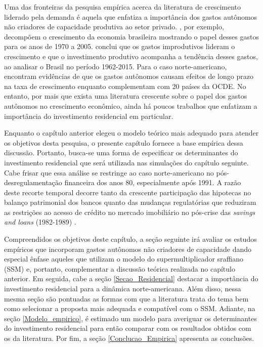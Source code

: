 Uma das fronteiras da pesquisa empírica acerca da literatura de crescimento liderado pela demanda é aquela que enfatiza a importância dos gastos autônomos não criadores de capacidade produtiva ao setor privado. \textcite{freitas_pattern_2013}, por exemplo, decompõem o crescimento da economia brasileira mostrando o papel desses gastos para os anos de  1970 a 2005. \textcite{braga_investment_2018} conclui que os gastos improdutivos lideram o crescimento e que o investimento produtivo acompanha a tendência desses gastos, ao analisar o Brasil no período 1962-2015. Para o caso norte-americano, \textcite{girardi_long-run_2016} encontram evidências de que os gastos autônomos causam efeitos de longo prazo na taxa de crescimento enquanto \textcite{girardi_autonomous_2018} complementam com 20 países da OCDE. No entanto, por mais que exista uma literatura crescente sobre o papel dos gastos autônomos no crescimento econômico, ainda há poucos trabalhos que enfatizam a importância do investimento residencial em particular. 

Enquanto o capítulo anterior elegeu o modelo teórico mais adequado para atender os objetivos desta pesquisa, o presente capítulo fornece a base empírica dessa discussão. Portanto, busca-se uma forma de especificar os determinantes do investimento residencial que será utilizada nas simulações do capítulo seguinte. 
Cabe frisar que essa análise se restringe ao caso norte-americano no pós-desregulamentação financeira dos anos 80, especialmente após 1991. 
A razão deste recorte temporal decorre tanto da crescente participação das hipotecas no balanço patrimonial dos bancos \cite{jorda_great_2014} quanto das mudanças regulatórias que reduziram as restrições ao acesso de crédito no mercado imobiliário no pós-crise das \textit{savings and loans} (1982-1989) \cites{linneman_impacts_1989}{duca_empirical_1991}{federal_deposit_insurance_corporation_savings_1997}. 

Compreendidos os objetivos deste capítulo, a seção seguinte irá avaliar os estudos empíricos que incorporam gastos autônomos não criadores de capacidade dando especial ênfase aqueles que utilizam o modelo do supermultiplicador sraffiano (SSM) e, portanto, complementar a discussão teórica realizada no capítulo anterior. 
Em seguida, cabe a seção \ref{Secao_Residencial} destacar a importância do investimento residencial para a dinâmica norte-americana. Além disso, nessa mesma seção são pontuadas as formas com que a literatura trata do tema bem como selecionar a proposta mais adequada e compatível com o SSM. 
Adiante, na seção \ref{Modelo_empirico}, é estimado um modelo  para averiguar os determinantes do investimento residencial para então comparar com os resultados obtidos com os da literatura. Por fim, a seção \ref{Conclucao_Empirica} apresenta as conclusões.